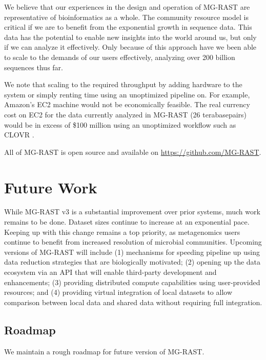 \documentclass[12pt,fullpage]{report}
\begin{document}
We believe that our experiences in the design and operation of MG-RAST are representative of bioinformatics as a whole. The community resource model is critical if we are to benefit from the exponential growth in sequence data. This data has the potential to enable new insights into the world around us, but only if we can analyze it effectively. Only because of this approach have we been able to scale to the demands of our users effectively, analyzing over 200 billion sequences thus far.

We note that scaling to the required throughput by adding hardware to the system or simply renting time using an unoptimized pipeline on. For example,  Amazon's EC2 machine would not be economically feasible. The real currency cost on EC2 for the data currently analyzed in MG-RAST (26 terabasepairs) would be in excess of \$100 million using an unoptimized workflow such as CLOVR \cite{CLOVR}.

All of MG-RAST is open source and available on \url{https://github.com/MG-RAST}.
\section{Future Work}

While MG-RAST v3 is a substantial improvement over prior systems, much work remains to be done. Dataset sizes continue to increase at an exponential pace. Keeping up with this change remains a top priority, as metagenomics users continue to benefit from increased resolution of microbial communities. Upcoming versions of MG-RAST will include (1) mechanisms for speeding pipeline up using data reduction strategies that are biologically motivated; (2) opening up the data ecosystem via an API that will enable third-party development and enhancements; (3) providing distributed compute capabilities using user-provided resources; and (4) providing virtual integration of local datasets to allow comparison between local data and shared data without requiring full integration.
\subsection{Roadmap}
We maintain a rough roadmap for future version of MG-RAST.
\end{document}
